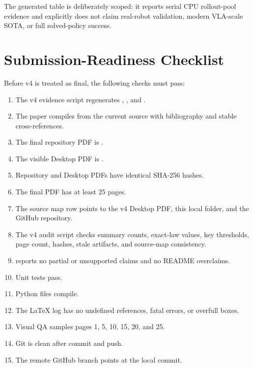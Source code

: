 
The generated table is deliberately scoped: it reports serial CPU
rollout-pool evidence and explicitly does not claim real-robot validation,
modern VLA-scale SOTA, or full solved-policy success.

\section{Submission-Readiness Checklist}
\label{app:submission-checklist}

Before v4 is treated as final, the following checks must pass:
\begin{enumerate}
\item The v4 evidence script regenerates ,
, and .
\item The paper compiles from the current source with bibliography and stable
cross-references.
\item The final repository PDF is
.
\item The visible Desktop PDF is
.
\item Repository and Desktop PDFs have identical SHA-256 hashes.
\item The final PDF has at least 25 pages.
\item The source map row points to the v4 Desktop PDF, this local folder, and
the GitHub repository.
\item The v4 audit script checks summary counts, exact-law values, key
thresholds, page count, hashes, stale artifacts, and source-map consistency.
\item {} reports no partial or unsupported
claims and no README overclaims.
\item Unit tests pass.
\item Python files compile.
\item The LaTeX log has no undefined references, fatal errors, or overfull
boxes.
\item Visual QA samples pages 1, 5, 10, 15, 20, and 25.
\item Git is clean after commit and push.
\item The remote GitHub branch points at the local commit.
\end{enumerate}

